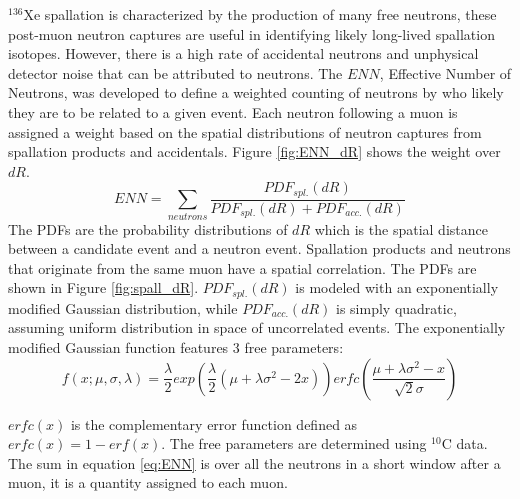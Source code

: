 $^{136}$Xe spallation is characterized by the production of many free neutrons, these post-muon neutron captures are useful in identifying likely long-lived spallation isotopes. However, there is a high rate of accidental neutrons and unphysical detector noise that can be attributed to neutrons. The $ENN$, Effective Number of Neutrons, was developed to define a weighted counting of neutrons by who likely they are to be related to a given event. Each neutron following a muon is assigned a weight based on the spatial distributions of neutron captures from spallation products and accidentals. Figure \ref{fig:ENN_dR} shows the weight over $dR$.
\begin{equation}
	\label{eq:ENN}
	ENN = \sum_{neutrons}\frac{PDF_{spl.}(dR)}{PDF_{spl.}(dR)+PDF_{acc.}(dR)}
\end{equation}
The PDFs are the probability distributions of $dR$ which is the spatial distance between a candidate event and a neutron event. Spallation products and neutrons that originate from the same muon have a spatial correlation. The PDFs are shown in Figure \ref{fig:spall_dR}. $PDF_{spl.}(dR)$ is modeled with an exponentially modified Gaussian distribution, while $PDF_{acc.}(dR)$ is simply quadratic, assuming uniform distribution in space of uncorrelated events. The exponentially modified Gaussian function features 3 free parameters:
\begin{equation}
	f(x;\mu,\sigma,\lambda)=\frac{\lambda}{2}exp\left(\frac{\lambda}{2}(\mu+\lambda\sigma^2-2x)\right)erfc\left(\frac{\mu+\lambda\sigma^2-x}{\sqrt{2}\sigma}\right)
\end{equation}

$erfc(x)$ is the complementary error function defined as $erfc(x)=1-erf(x)$. The free parameters are determined using $^{10}$C data. The sum in equation \ref{eq:ENN} is over all the neutrons in a short window after a muon, it is a quantity assigned to each muon.

